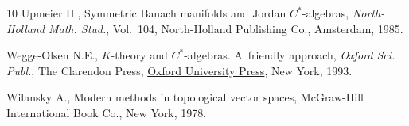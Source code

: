 \begin{thebibliography}{10}
Upmeier H., Symmetric {B}anach manifolds and {J}ordan {$C^\ast$}-algebras,
 \textit{North-Holland Math. Stud.}, Vol.~104, North-Holland Publishing Co.,
 Amsterdam, 1985.

Wegge-Olsen N.E., {$K$}-theory and {$C^*$}-algebras. {A}~friendly approach,
 \textit{Oxford Sci. Publ.}, The Clarendon Press, \href{https://doi.org/10.1093/oso/9780198596943.001.0001}{Oxford University Press}, New York,
 1993.

Wilansky A., Modern methods in topological vector spaces, McGraw-Hill
 International Book Co., New York, 1978.

\end{thebibliography}
